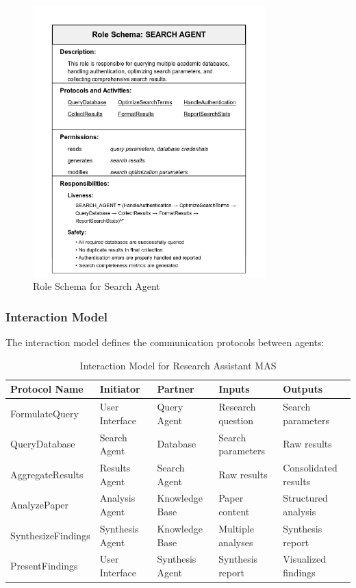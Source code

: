 \documentclass[11pt,a4paper]{article}
\begin{document}
\begin{figure}[H]
    \centering
    \includegraphics[width=0.8\textwidth]{images/role-model.png}
    \caption{Role Schema for Search Agent}
    \label{fig:role-model}
\end{figure}

\subsubsection{Interaction Model}
The interaction model defines the communication protocols between agents:

\begin{table}[H]
    \centering
    \begin{tabular}{|p{3cm}|p{2.5cm}|p{2.5cm}|p{3cm}|p{3cm}|}
    \hline
    \textbf{Protocol Name} & \textbf{Initiator} & \textbf{Partner} & \textbf{Inputs} & \textbf{Outputs} \\
    \hline
    FormulateQuery & User Interface & Query Agent & Research question & Search parameters \\
    \hline
    QueryDatabase & Search Agent & Database & Search parameters & Raw results \\
    \hline
    AggregateResults & Results Agent & Search Agent & Raw results & Consolidated results \\
    \hline
    AnalyzePaper & Analysis Agent & Knowledge Base & Paper content & Structured analysis \\
    \hline
    SynthesizeFindings & Synthesis Agent & Knowledge Base & Multiple analyses & Synthesis report \\
    \hline
    PresentFindings & User Interface & Synthesis Agent & Synthesis report & Visualized findings \\
    \hline
    \end{tabular}
    \caption{Interaction Model for Research Assistant MAS}
    \label{tab:interaction-model}
\end{table}
\end{document}
